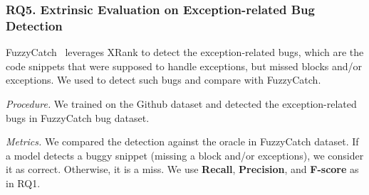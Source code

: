 
\subsubsection{RQ5. Extrinsic Evaluation on Exception-related Bug Detection\\}


 FuzzyCatch~\cite{xrank-fse20} leverages XRank
to detect the exception-related bugs, which are the code snippets that
were supposed to handle exceptions, but missed
 blocks and/or exceptions. We used {\tool} to detect
such bugs and compare with FuzzyCatch.

{\em Procedure.} We trained {\tool} on the Github dataset and detected
the exception-related bugs in FuzzyCatch bug dataset.

{\em Metrics.} We compared the detection against the oracle in
FuzzyCatch dataset. If a model detects a buggy snippet (missing a
 block and/or exceptions), we consider it as correct.
Otherwise, it is a miss. We use {\bf Recall}, {\bf
  Precision}, and {\bf F-score} as in RQ1.
